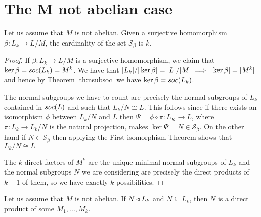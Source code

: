 \section{The M not abelian case}

\begin{theorem}
    \label{cardS}
    Let us assume that $M$ is not abelian. Given a surjective homomorphism $\beta \colon L_k \rightarrow L/M$, the cardinality of the set $\mathscr{S}_\beta$ is $k$.
\end{theorem}

\begin{proof}
    If $\beta \colon L_k \rightarrow L/M$ is a surjective homomorphism, we claim that $\ker \beta = soc {(L_k)} = M^k$.
    We have that $| L_k |/| \ker \beta | = | L |/| M | \implies | \ker \beta | = | M^k |$ and hence by Theorem \ref{th:nsubsoc} we have $\ker \beta = soc {(L_k)}$.

    The normal subgroups we have to count are precisely the normal subgroups of $L_k$ contained in $soc {(L)}$ and such that $L_k/N \cong L$. This follows since if there exists an isomorphism $\phi$ between $L_k/N$ and $L$ then 
    $\Psi = \phi \circ \pi \colon L_K \rightarrow L$, where $\pi \colon L_k \rightarrow L_k/N$ is the natural projection, makes $\ker \Psi = N \in \mathscr{S}_\beta$. On the other hand if $N \in \mathscr{S}_\beta$ then applying the First isomorphism Theorem shows that $L_k/N \cong L$  
    
    The $k$ direct factors of $M^k$ are the unique minimal normal subgroups of $L_k$ and the normal subgroups $N$ we are considering are precisely the direct products of $k-1$ of them, so we have exactly $k$ possibilities.
\end{proof}

\begin{theorem}
    \label{S4:Ndp}
    Let us assume that $M$ is not abelian. If $N \triangleleft L_k$ and $N \subseteq L_k$, then $N$ is a direct product of some $M_1,...,M_k$.
\end{theorem}

